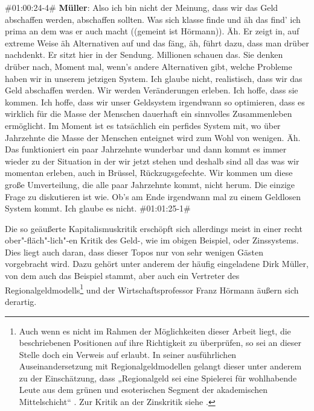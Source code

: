 \begin{description}
	\begin{linenumbers}[1]
		\item \#01:00:24-4\# \textbf{Müller}: Also ich bin nicht der Meinung, dass wir das Geld abschaffen werden, abschaffen sollten. Was sich klasse finde und äh das find' ich prima an dem was er auch macht ((gemeint ist Hörmann)). Äh. Er zeigt in, auf extreme Weise äh Alternativen auf und das fäng, äh, führt dazu, dass man drüber nachdenkt. Er sitzt hier in der Sendung. Millionen schauen das. Sie denken drüber nach, Moment mal, wenn's andere Alternativen gibt, welche Probleme haben wir in unserem jetzigen System. Ich glaube nicht, realistisch, dass wir das Geld abschaffen werden. Wir werden Veränderungen erleben. Ich hoffe, dass sie kommen. Ich hoffe, dass wir unser Geldsystem irgendwann so optimieren, dass es wirklich für die Masse der Menschen dauerhaft ein sinnvolles Zusammenleben ermöglicht. Im Moment ist es tatsächlich ein perfides System mit, wo über Jahrzehnte die Masse der Menschen enteignet wird zum Wohl von wenigen. Äh. Das funktioniert ein paar Jahrzehnte wunderbar und dann kommt es immer wieder zu der Situation in der wir jetzt stehen und deshalb sind all das was wir momentan erleben, auch in Brüssel, Rückzugsgefechte. Wir kommen um diese große Umverteilung, die alle paar Jahrzehnte kommt, nicht herum. Die einzige Frage zu diskutieren ist wie. Ob's am Ende irgendwann mal zu einem Geldlosen System kommt. Ich glaube es nicht. \#01:01:25-1\# 
	\end{linenumbers}
	\label{lis:27}
\end{description}

Die so geäußerte Kapitalismuskritik erschöpft sich allerdings meist in einer recht ober"-fläch"-lich"-en Kritik des Geld-, wie im obigen Beispiel, oder Zinssystems. Dies liegt auch daran, dass dieser Topos nur von sehr wenigen Gästen vorgebracht wird. Dazu gehört unter anderem der häufig eingeladene Dirk Müller, von dem auch das Beispiel stammt, aber auch ein Vertreter des Regionalgeldmodells\footnote{Auch wenn es nicht im Rahmen der Möglichkeiten dieser Arbeit liegt, die beschriebenen Positionen auf ihre Richtigkeit zu überprüfen, so sei an dieser Stelle doch ein Verweis auf \textcite{bierlSchwundgeldFreiwirtschaftUnd2012} erlaubt. In seiner ausführlichen Auseinandersetzung mit Regionalgeldmodellen gelangt dieser unter anderem zu der Einschätzung, dass „Regionalgeld sei eine Spielerei für wohlhabende Leute aus dem grünen und esoterischen Segment der akademischen Mittelschicht“ \parencite[37]{bierlSchwundgeldFreiwirtschaftUnd2012}. Zur Kritik an der Zinskritik siehe \textcite{bergerKritikZinskritik2011}.} und der Wirtschaftsprofessor Franz Hörmann äußern sich derartig.

